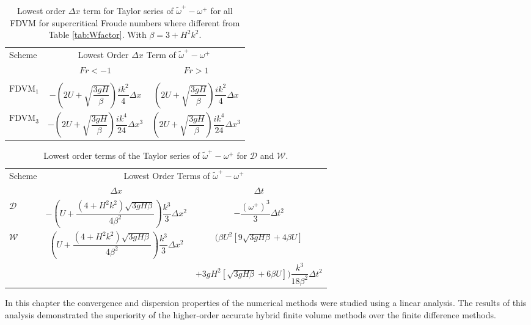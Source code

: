 \begin{table}
	\begin{tabular}{l  c  c}
	\hline
		Scheme &\multicolumn{2}{c}{Lowest Order $\Delta x$ Term of $\widetilde{\omega}^+-\omega^+$} \T\B \\
			\cline{2-3} 
			& $Fr < - 1$&$ Fr >1$ \T\B  \\
		\hline & \\
		$\text{FDVM}_1$& $-\left(2U + \sqrt{\dfrac{3gH}{\beta}}\right)  \dfrac{ik^2}{4} \Delta x$ &  $\left(2U + \sqrt{\dfrac{3gH}{\beta}}\right)  \dfrac{ik^2}{4} \Delta x$  \T\B   \\
		$\text{FDVM}_3$& $-\left(2U + \sqrt{\dfrac{3gH}{\beta}} \right) \dfrac{ik^4}{24} \Delta x^3$ & $\left(2U + \sqrt{\dfrac{3gH}{\beta}} \right) \dfrac{ik^4}{24} \Delta x^3$  \T\B  \\
		\hline
	\end{tabular}
	\caption{Lowest order $\Delta x$ term for Taylor series of $\widetilde{\omega}^+-\omega^+$ for all FDVM for supercritical Froude numbers where different from Table \ref{tab:Wfactor}. With $\beta = 3 + H^2 k^2 $. }
	\label{tab:Wspatfactor} 
\end{table}
	
\begin{table}
\begin{tabular}{l  c  c}
\hline
	Scheme & \multicolumn{2}{c}{Lowest Order Terms of $\widetilde{\omega}^+-\omega^+$} \T\B \\
	\cline{2-3}
	& $\Delta x$&$\Delta t$ \T\B \\
	\hline
	$\mathcal{D}$& $- \left(U + \dfrac{\left( 4 + H^2k^2\right)\sqrt{3gH\beta}}{4 \beta^2}\right)\dfrac{k^3}{3 }\Delta x^2$  &$ -\dfrac{\left(\omega^+\right)^3}{3}\Delta t^2$ \T\B  \\
	$\mathcal{W}$& $\left(U + \dfrac{\left( 4 + H^2k^2\right)\sqrt{3gH\beta}}{4 \beta^2}\right)\dfrac{k^3}{3 }\Delta x^2$  &$ \Bigg( \beta U^2\left[9\sqrt{3gH \beta} + 4 \beta U\right]  $  \T\B \\ & & $+ 3gH^2\left[\sqrt{3gH \beta} + 6 \beta U\right] \Bigg) \dfrac{k^3}{18 \beta^2}\Delta t^2$ \T\B  \\ \hline
\end{tabular}
	\caption{Lowest order terms of the Taylor series of $\widetilde{\omega}^+-\omega^+$ for $\mathcal{D}$ and $\mathcal{W}$. }
	\label{tab:WFDspatfactor} 
\end{table}
 
 \medskip
 
 In this chapter the convergence and dispersion properties of the numerical methods were studied using a linear analysis. The results of this analysis demonstrated the superiority of the higher-order accurate hybrid finite volume methods over the finite difference methods.